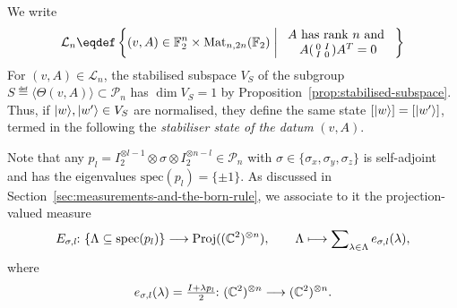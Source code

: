 \documentclass[a4paper, oneside, 12pt]{amsart}
\newcommand*{\PauliGroup}{\ensuremath{\mathcal{P}}}
\begin{document}
\begin{remark}\label{rmk:states-via-binary-data}
  We write
  \begin{equation*}
    \mathcal{L}_n \eqdef
    \left\{(v,A) \in \mathbb{F}_{2}^{n}\times \Mat_{n,2n}( \mathbb{F}_{2}) \;\middle|\;
      \begin{array}{c}
        A \text{ has rank }n \text{ and }\\
        A
        \begin{psmallmatrix}
          0 & I \\ I & 0
        \end{psmallmatrix}A^{T} = 0
      \end{array}
    \right\}
  \end{equation*}
  For \((v,A) \in \mathcal{L}_n\), the stabilised subspace \(V_{S}\) of the subgroup \(S \eqdef \langle \Theta(v,A) \rangle \subset \PauliGroup_{n}\) has \(\dim V_S = 1\) by Proposition~\ref{prop:stabilised-subspace}.
  Thus, if \(\lvert w\rangle, \lvert w'\rangle \in V_S\) are normalised, they define the same state \([\lvert w\rangle] = [\lvert w'\rangle]\), termed in the following the \emph{stabiliser state of the datum} \((v,A)\).
\end{remark}

Note that any \(p_{l} = I_{2}^{\otimes l-1} \otimes \sigma \otimes I_{2}^{\otimes n-l} \in \PauliGroup_{n}\) with \(\sigma \in \{\sigma_{x}, \sigma_{y}, \sigma_{z}\}\) is self-adjoint and has the eigenvalues \(\mathrm{spec}(p_{l}) =\{\pm 1\}\).
As discussed in Section~\ref{sec:measurements-and-the-born-rule}, we associate to it the projection-valued measure
\begin{equation*}
  E_{\sigma,l} \from \{ \Lambda \subseteq \mathrm{spec}(p_{l})\} \to \mathrm{Proj}((\mathbb{C}^{2})^{\otimes n}), \qquad \Lambda \mapsto \sum\nolimits_{\lambda \in \Lambda}e_{\sigma,l}(\lambda),
\end{equation*}
where
\begin{equation*}
  e_{\sigma,l}(\lambda) = \tfrac{I + \lambda p_{l}}{2} \from ( \mathbb{C}^{2})^{\otimes n} \to ( \mathbb{C}^{2})^{ \otimes n}.
\end{equation*}
\end{document}
